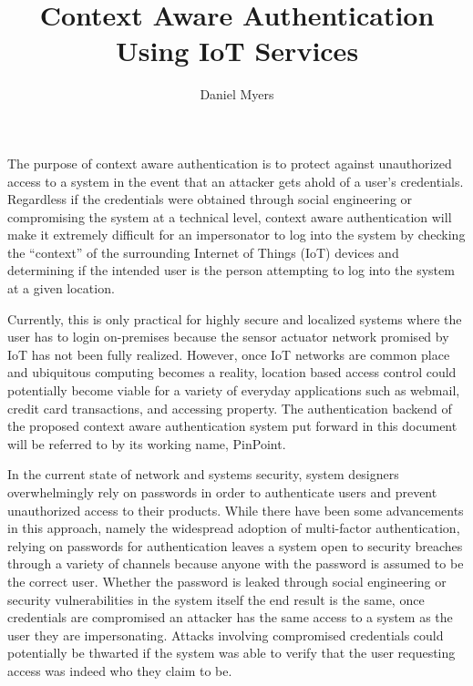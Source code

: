\documentclass[11pt,journal]{IEEEtran}
\begin{document}
\title{Context Aware Authentication Using IoT Services}
\maketitle

\author{Daniel Myers}


The purpose of context aware authentication is to protect against unauthorized access to a system in the event that an attacker gets ahold of a user’s credentials. Regardless if the credentials were obtained through social engineering or compromising the system at a technical level, context aware authentication will make it extremely difficult for an impersonator to log into the system by checking the “context” of the surrounding Internet of Things (IoT) devices and determining if the intended user is the person attempting to log into the system at a given location. 

Currently, this is only practical for highly secure and localized systems where the user has to login on-premises because the sensor actuator network promised by IoT has not been fully realized. However, once IoT networks are common place and ubiquitous computing becomes a reality, location based access control could potentially become viable for a variety of everyday applications such as webmail, credit card transactions, and accessing property. The authentication backend of the proposed context aware authentication system put forward in this document will be referred to by its working name, PinPoint.

In the current state of network and systems security, system designers overwhelmingly rely on passwords in order to authenticate users and prevent unauthorized access to their products.  While there have been some advancements in this approach, namely the widespread adoption of multi-factor authentication, relying on passwords for authentication leaves a system open to security breaches through a variety of channels because anyone with the password is assumed to be the correct user.  Whether the password is leaked through social engineering or security vulnerabilities in the system itself the end result is the same, once credentials are compromised an attacker has the same access to a system as the user they are impersonating.  Attacks involving compromised credentials could potentially be thwarted if the system was able to verify that the user requesting access was indeed who they claim to be.
\end{document}
